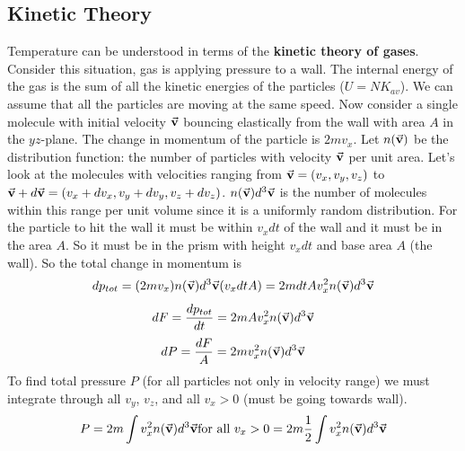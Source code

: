    \subsection*{Kinetic Theory}
        Temperature can be understood in terms of the \textbf{kinetic theory of gases}. Consider this situation, gas is applying pressure to a wall. The internal energy of the gas is the sum of all the kinetic energies of the particles ($U = NK_{av}$). We can assume that all the particles are moving at the same speed. 
        \newline \indent
        Now consider a single molecule with initial velocity $\va{v}$ bouncing elastically from the wall with area $A$ in the $yz$-plane. The change in momentum of the particle is $2mv_x$. 
        \newline \indent
        Let $n(\va{v})$ be the distribution function: the number of particles with velocity $\va{v}$ per unit area. Let's look at the molecules with velocities ranging from $\va{v} = (v_x, v_y, v_z)$ to $\va{v} + d\va{v} = (v_x + dv_x, v_y + dv_y, v_z + dv_z)$. $n(\va{v}) d^3\va{v}$ is the number of molecules within this range per unit volume since it is a uniformly random distribution.
        \newline \indent
        For the particle to hit the wall it must be within $v_x dt$ of the wall and it must be in the area $A$. So it must be in the prism with height $v_x dt$ and base area $A$ (the wall).
        \newline \indent
        So the total change in momentum is
        \begin{equation*}
            dp_{tot} = (2mv_x)n(\va{v})d^3\va{v}(v_xdtA) = 2mdtAv_x^2n(\va{v})d^3\va{v}
        \end{equation*}
        \begin{equation*}        
            dF = \frac{dp_{tot}}{dt} = 2mAv_x^2n(\va{v})d^3\va{v}
        \end{equation*}
        \begin{equation*}
            dP = \frac{dF}{A} = 2mv_x^2n(\va{v})d^3\va{v}
        \end{equation*}
        To find total pressure $P$ (for all particles not only in velocity range) we must integrate through all $v_y$, $v_z$, and all $v_x > 0$ (must be going towards wall).
        \begin{equation*}
            P = 2m\int v_x^{2}n(\va{v})d^3\va{v} \text{for all $v_x > 0$} = 2m\frac{1}{2}\int v_x^{2}n(\va{v})d^3\va{v}
        \end{equation*}
